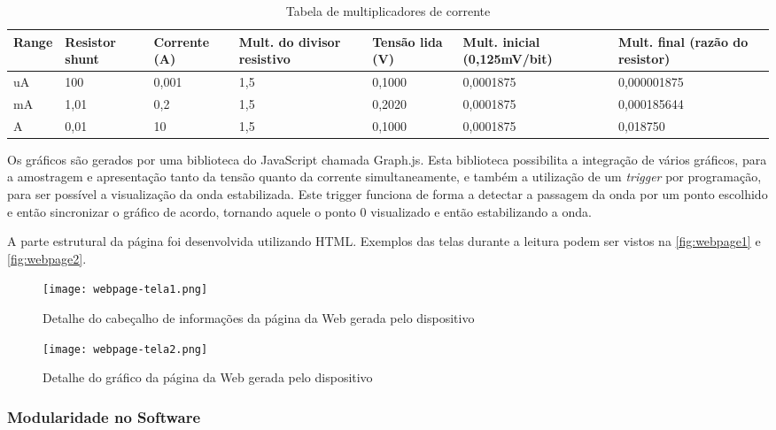 \begin{table}[h!]
    \centering
    \caption{Tabela de multiplicadores de corrente}
    \begin{tabularx}{\textwidth}{|X|X|X|X|X|X|X|}
        \hline
        \textbf{Range} & \textbf{Resistor shunt} & \textbf{Corrente (A)} & \textbf{Mult. do divisor resistivo} & \textbf{Tensão lida (V)} & \textbf{Mult. inicial (0,125mV/bit)} & \textbf{Mult. final (razão do resistor)} \\
        \hline
        uA & 100 & 0,001 & 1,5 & 0,1000 & 0,0001875 & 0,000001875 \\
        mA & 1,01 & 0,2 & 1,5 & 0,2020 & 0,0001875 & 0,000185644 \\
        A & 0,01 & 10 & 1,5 & 0,1000 & 0,0001875 & 0,018750 \\
        \hline
    \end{tabularx}
    \label{tab:softw-corrente-values}
    \fonte{}
\end{table}


Os gráficos são gerados por uma biblioteca do JavaScript chamada Graph.js. Esta biblioteca possibilita a integração de vários gráficos, para a amostragem e apresentação tanto da tensão quanto da corrente simultaneamente, e também a utilização de um \textit{trigger} por programação, para ser possível a visualização da onda estabilizada. Este trigger funciona de forma a detectar a passagem da onda por um ponto escolhido e então sincronizar o gráfico de acordo, tornando aquele o ponto 0 visualizado e então estabilizando a onda.

A parte estrutural da página foi desenvolvida utilizando \gls{HTML}. Exemplos das telas durante a leitura podem ser vistos na \autoref{fig:webpage1} e \autoref{fig:webpage2}.

\begin{figure}[h!]
    \centering
    \caption{Detalhe do cabeçalho de informações da página da Web gerada pelo dispositivo}
    \texttt{[image: webpage-tela1.png]}
    \label{fig:webpage1}
    \fonte{}
\end{figure}

\begin{figure}[h!]
    \centering
    \caption{Detalhe do gráfico da página da Web gerada pelo dispositivo}
    \texttt{[image: webpage-tela2.png]}
    \label{fig:webpage2}
    \fonte{}
\end{figure}

\subsubsection{Modularidade no Software}\label{modular-softw}


